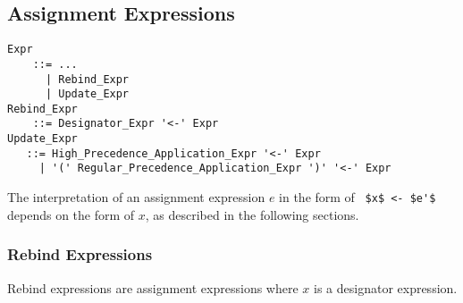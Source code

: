 \subsection{Assignment Expressions}

\grammar\begin{lstlisting}
Expr
    ::= ...
      | Rebind_Expr
      | Update_Expr
Rebind_Expr 
    ::= Designator_Expr '<-' Expr
Update_Expr
   ::= High_Precedence_Application_Expr '<-' Expr
     | '(' Regular_Precedence_Application_Expr ')' '<-' Expr
\end{lstlisting}

The interpretation of an assignment expression $e$ in the form of ~\lstinline!$x$ <- $e'$!~ depends on the form of $x$, as described in the following sections. 

\subsubsection{Rebind Expressions}

Rebind expressions are assignment expressions where $x$ is a designator expression. 

